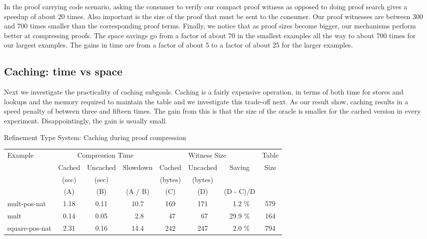 \documentclass{llncs}
\begin{document}
In the proof carrying code scenario, asking the
consumer to verify our compact proof witness as opposed to doing proof
search gives a speedup of about 20 times. Also important is the size
of the proof that must be sent to the consumer. Our proof witnesses
are between 300 and 700 times smaller than the corresponding proof
terms.
Finally, we notice that as proof sizes become bigger, our mechanisms perform
better at compressing proofs.  The space savings go from a factor of
about 70 in the smallest examples all the way to about 700 times for
our largest examples. The gains in time are from a factor of about 5
to a factor of about 25 for the larger examples.

\subsection{Caching: time vs space}
Next we investigate the practicality of caching subgoals. Caching is a
fairly expensive operation, in terms of both time for stores and
lookups and the memory required to maintain the table and we
investigate this trade-off next. As our result show, caching results in
a speed penalty of between three and fifteen times. The gain from this
is that the size of the oracle is smaller for the cached version in
every experiment. Disappointingly, the gain is usually small.

\begin{center}
Refinement Type System: Caching during proof compression
\begin{small}
\begin{tabular}{|l|c|c|c|c|c|c|c|}
\hline
Example & \multicolumn{3}{c}{Compression Time} & 
\multicolumn{3}{c}{Witness Size} & Table\\
& Cached & Uncached & Slowdown & Cached & Uncached & Saving & Size\\
& (sec) & (sec) &  & (bytes) & (bytes) & & \\
& (A) & (B) & (A / B) & (C) & (D) & (D - C)/D &\\
\hline
mult-pos-nat & 1.18 & 0.11 & 10.7 & 169 & 171 & \ 1.2 \% & 579\\
mult & 0.14 & 0.05 & \ 2.8 & \ 47 & \ 67 & 29.9 \% & 164\\
square-pos-nat & 2.31 & 0.16 & 14.4 & 242 & 247 & \ 2.0 \% & 794\\
\hline
\end{tabular}
\end{small}
\end{center}
\end{document}
